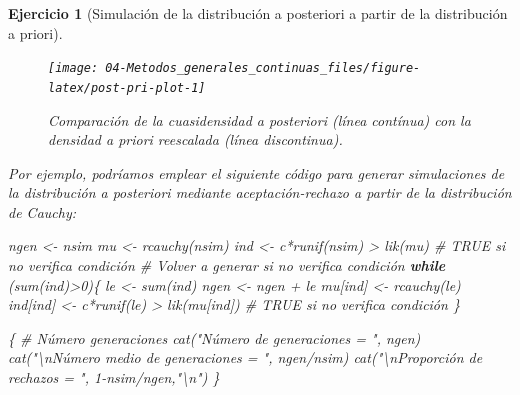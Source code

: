 \documentclass[
]{book}
\newenvironment{Shaded}{\begin{snugshade}}{\end{snugshade}}
\newcommand{\CommentTok}[1]{\textcolor[rgb]{0.56,0.35,0.01}{\textit{#1}}}
\newcommand{\ControlFlowTok}[1]{\textcolor[rgb]{0.13,0.29,0.53}{\textbf{#1}}}
\newcommand{\DecValTok}[1]{\textcolor[rgb]{0.00,0.00,0.81}{#1}}
\newcommand{\FunctionTok}[1]{\textcolor[rgb]{0.00,0.00,0.00}{#1}}
\newcommand{\NormalTok}[1]{#1}
\newcommand{\OtherTok}[1]{\textcolor[rgb]{0.56,0.35,0.01}{#1}}
\newcommand{\SpecialCharTok}[1]{\textcolor[rgb]{0.00,0.00,0.00}{#1}}
\newcommand{\StringTok}[1]{\textcolor[rgb]{0.31,0.60,0.02}{#1}}
\theoremstyle{break}
\newtheorem{exercise}{Ejercicio}[chapter]
\theoremstyle{nonumberplain}
\begin{document}
\begin{exercise}[Simulación de la distribución a posteriori a partir de la distribución a priori]
\begin{enumerate}
  \begin{figure}[!htb]

  {\centering \texttt{[image: 04-Metodos\_generales\_continuas\_files/figure-latex/post-pri-plot-1]} 

  }

  \caption{Comparación de la cuasidensidad a posteriori (línea contínua) con la densidad a priori reescalada (línea discontinua).}\label{fig:post-pri-plot}
  \end{figure}

  Por ejemplo, podríamos emplear el siguiente código para generar simulaciones de la distribución a posteriori mediante aceptación-rechazo a partir de la distribución de Cauchy:

\begin{Shaded}
\begin{Highlighting}[]
\NormalTok{ngen }\OtherTok{\textless{}{-}}\NormalTok{ nsim}
\NormalTok{mu }\OtherTok{\textless{}{-}} \FunctionTok{rcauchy}\NormalTok{(nsim)}
\NormalTok{ind }\OtherTok{\textless{}{-}}\NormalTok{ c}\SpecialCharTok{*}\FunctionTok{runif}\NormalTok{(nsim) }\SpecialCharTok{\textgreater{}} \FunctionTok{lik}\NormalTok{(mu) }\CommentTok{\# TRUE si no verifica condición}
\CommentTok{\# Volver a generar si no verifica condición}
\ControlFlowTok{while}\NormalTok{ (}\FunctionTok{sum}\NormalTok{(ind)}\SpecialCharTok{\textgreater{}}\DecValTok{0}\NormalTok{)\{}
\NormalTok{  le }\OtherTok{\textless{}{-}} \FunctionTok{sum}\NormalTok{(ind)}
\NormalTok{  ngen }\OtherTok{\textless{}{-}}\NormalTok{ ngen }\SpecialCharTok{+}\NormalTok{ le}
\NormalTok{  mu[ind] }\OtherTok{\textless{}{-}} \FunctionTok{rcauchy}\NormalTok{(le)}
\NormalTok{  ind[ind] }\OtherTok{\textless{}{-}}\NormalTok{ c}\SpecialCharTok{*}\FunctionTok{runif}\NormalTok{(le) }\SpecialCharTok{\textgreater{}} \FunctionTok{lik}\NormalTok{(mu[ind]) }\CommentTok{\# TRUE si no verifica condición}
\NormalTok{\}}

\NormalTok{\{ }\CommentTok{\# Número generaciones}
  \FunctionTok{cat}\NormalTok{(}\StringTok{"Número de generaciones = "}\NormalTok{, ngen)}
  \FunctionTok{cat}\NormalTok{(}\StringTok{"}\SpecialCharTok{\textbackslash{}n}\StringTok{Número medio de generaciones = "}\NormalTok{, ngen}\SpecialCharTok{/}\NormalTok{nsim)}
  \FunctionTok{cat}\NormalTok{(}\StringTok{"}\SpecialCharTok{\textbackslash{}n}\StringTok{Proporción de rechazos = "}\NormalTok{, }\DecValTok{1}\SpecialCharTok{{-}}\NormalTok{nsim}\SpecialCharTok{/}\NormalTok{ngen,}\StringTok{"}\SpecialCharTok{\textbackslash{}n}\StringTok{"}\NormalTok{)}
\NormalTok{\}}
\end{Highlighting}
\end{Shaded}


\end{enumerate}
\end{exercise}
\end{document}
